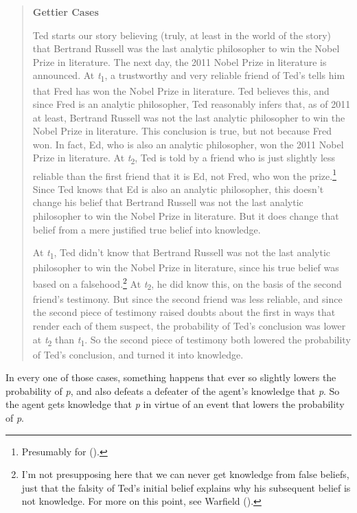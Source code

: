 \documentclass[
  10pt,
  letterpaper,
  DIV=11,
  numbers=noendperiod,
  twoside]{scrartcl}
\begin{document}
\begin{quote}
\textbf{Gettier Cases}

Ted starts our story believing (truly, at least in the world of the
story) that Bertrand Russell was the last analytic philosopher to win
the Nobel Prize in literature. The next day, the 2011 Nobel Prize in
literature is announced. At \emph{t}\textsubscript{1}, a trustworthy and
very reliable friend of Ted's tells him that Fred has won the Nobel
Prize in literature. Ted believes this, and since Fred is an analytic
philosopher, Ted reasonably infers that, as of 2011 at least, Bertrand
Russell was not the last analytic philosopher to win the Nobel Prize in
literature. This conclusion is true, but not because Fred won. In fact,
Ed, who is also an analytic philosopher, won the 2011 Nobel Prize in
literature. At \emph{t}\textsubscript{2}, Ted is told by a friend who is
just slightly less reliable than the first friend that it is Ed, not
Fred, who won the prize.\footnote{Presumably for
  ().} Since Ted knows that Ed
is also an analytic philosopher, this doesn't change his belief that
Bertrand Russell was not the last analytic philosopher to win the Nobel
Prize in literature. But it does change that belief from a mere
justified true belief into knowledge.

At \emph{t}\textsubscript{1}, Ted didn't know that Bertrand Russell was
not the last analytic philosopher to win the Nobel Prize in literature,
since his true belief was based on a falsehood.\footnote{I'm not
  presupposing here that we can never get knowledge from false beliefs,
  just that the falsity of Ted's initial belief explains why his
  subsequent belief is not knowledge. For more on this point, see
  Warfield ().} At
\emph{t}\textsubscript{2}, he did know this, on the basis of the second
friend's testimony. But since the second friend was less reliable, and
since the second piece of testimony raised doubts about the first in
ways that render each of them suspect, the probability of Ted's
conclusion was lower at \emph{t}\textsubscript{2} than
\emph{t}\textsubscript{1}. So the second piece of testimony both lowered
the probability of Ted's conclusion, and turned it into knowledge.
\end{quote}

In every one of those cases, something happens that ever so slightly
lowers the probability of \emph{p}, and also defeats a defeater of the
agent's knowledge that \emph{p}. So the agent gets knowledge that
\emph{p} in virtue of an event that lowers the probability of \emph{p}.
\end{document}
